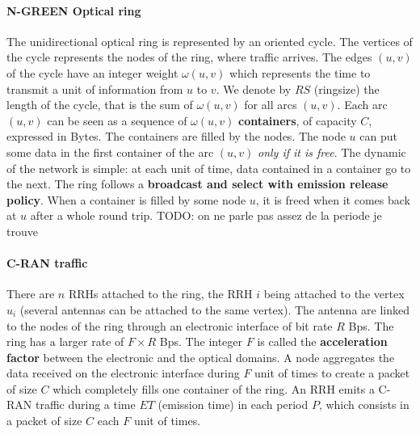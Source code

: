 \documentclass[]{algotel}
\newcommand{\todo}[1]{{\color{red} TODO: {#1}}}
\begin{document}
  \paragraph{N-GREEN Optical ring}
   
  The unidirectional optical ring is represented by an oriented cycle. The vertices of the cycle represents the nodes of the ring, where traffic arrives. The edges $(u,v)$ of the cycle have an integer weight $\omega(u,v)$ which represents the time to transmit a unit of information from $u$ to $v$. We denote by $RS$ (ringsize) the length of the cycle, that is the sum of $\omega(u,v)$ for all arcs $(u,v)$.  Each arc $(u,v)$ can be seen as a sequence of $\omega(u,v)$ {\bf containers}, of capacity $C$, expressed in Bytes.  The containers are filled by the nodes. The node $u$ can put some data in the first container of the arc $(u,v)$ \emph{only if it is free}. 
  The dynamic of the network is simple: at each unit of time, data contained in a container go to the next.
   The ring follows a {\bf broadcast and select with emission release policy}. When a container is filled by some node $u$,
   it is freed when it comes back at $u$ after a whole round trip.
   \todo{on ne parle pas assez de la periode je trouve}
   
   \paragraph{C-RAN traffic}
   
   There are $n$ RRHs attached to the ring, the RRH $i$ being attached to the vertex $u_i$ (several antennas can be attached to the same vertex). The antenna are linked to the nodes of the ring through an electronic interface of bit rate $R$ Bps.
   The ring has a larger rate of $F\times R$ Bps. The integer $F$ is called the {\bf acceleration factor} between the electronic and the optical domains. A node aggregates the data received on the electronic interface during $F$ unit of times to create a packet of size $C$ which completely fills one container of the ring. An RRH emits a C-RAN traffic during a time $ET$ (emission time) in each period $P$, which consists in a packet of size $C$ each $F$ unit of times.
   
\end{document}

